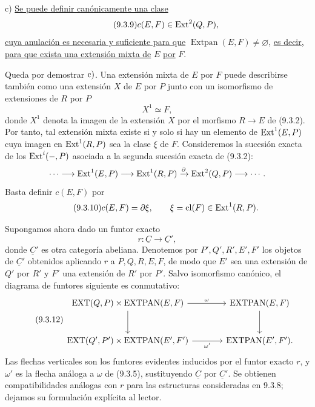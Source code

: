 \smallskip
\noindent
c) \underline{Se puede definir canónicamente una clase}
\begin{equation}\tag{9.3.9}
 c(E,F)\in\Ext^2(Q,P),
\end{equation}
\underline{cuya anulación es necesaria y suficiente para que}
$\operatorname{Extpan}(E,F)\neq\varnothing$, \underline{es decir, para
que exista una extensión mixta de} $E$ \underline{por} $F$.


Queda por demostrar $\sisi{\mathrm{d})}{\mathrm{c})}$. Una extensión
mixta de $E$ por $F$ puede describirse también como una extensión $X$
de $E$ por $P$ junto con un isomorfismo de extensiones de $R$ por $P$
\begin{equation*}
 X^1\simeq F,
\end{equation*}
donde $X^1$ denota la imagen de la extensión $X$ por el morfismo
$R\longrightarrow E$ de (9.3.2). Por tanto, tal extensión mixta existe
si y solo si hay un elemento de $\Ext^1(E,P)$ cuya imagen en
$\Ext^1(R,P)$ sea la clase $\xi$ de $F$. Consideremos la sucesión
exacta de los $\Ext^i(-,P)$ asociada a la segunda sucesión exacta de
(9.3.2):
\begin{equation*}
 \cdots\longrightarrow
 \Ext^1(E,P)\longrightarrow
 \Ext^1(R,P)
 \xrightarrow{\partial}
 \sisi{\Ext^2(R,Q)}{\Ext^2(Q,P)}\longrightarrow\cdots .
\end{equation*}
Basta definir $c(E,F)$ por
\begin{equation}\tag{9.3.10}
 c(E,F)=\partial\xi,
 \qquad
 \xi=\operatorname{cl}(F)\in\Ext^1(R,P).
\end{equation}

Supongamos ahora dado un funtor exacto
\begin{equation}\tag{9.3.11}
 r:\underline C\longrightarrow\underline C',
\end{equation}
donde $\underline C'$ es otra categoría abeliana. Denotemos por
$P',Q',R',E',F'$ los objetos de $\underline C'$ obtenidos aplicando
$r$ a $P,Q,R,E,F$, de modo que $E'$ sea una extensión de $Q'$ por $R'$
y $F'$ una extensión de $R'$ por $P'$. Salvo isomorfismo canónico, el
diagrama de funtores siguiente es conmutativo:
\begin{equation}\tag{9.3.12}
\begin{tikzcd}[column sep=large,row sep=large]
 \operatorname{EXT}(Q,P)\times\operatorname{EXTPAN}(E,F)
   \arrow[r,"\omega"]\arrow[d]
 &\operatorname{EXTPAN}(E,F)\arrow[d]\\
 \operatorname{EXT}(Q',P')\times\operatorname{EXTPAN}(E',F')
   \arrow[r,"\sisi{\omega}{\omega'}"']
 &\operatorname{EXTPAN}(E',F').
\end{tikzcd}
\end{equation}
Las flechas verticales son los funtores evidentes inducidos por el
funtor exacto $r$, y $\omega'$ es la flecha análoga a $\omega$ de
(9.3.5), sustituyendo $\underline C$ por $\underline C'$. Se obtienen
compatibilidades análogas con $r$ para las estructuras consideradas en
9.3.8; dejamos su formulación explícita al lector.

